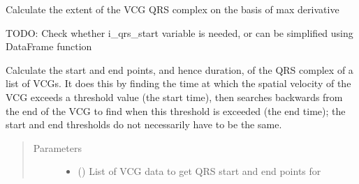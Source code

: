 \documentclass[letterpaper,10pt,english]{sphinxmanual}
\begin{document}
\begin{fulllineitems}
\label{\detokenize{_autosummary/signalanalysis.vcg.get_qrs_start_end:signalanalysis.vcg.get_qrs_start_end}}
\sphinxAtStartPar
Calculate the extent of the VCG QRS complex on the basis of max derivative

\sphinxAtStartPar
TODO: Check whether i\_qrs\_start variable is needed, or can be simplified using DataFrame function

\sphinxAtStartPar
Calculate the start and end points, and hence duration, of the QRS complex of a list of VCGs. It does this by
finding the time at which the spatial velocity of the VCG exceeds a threshold value (the start time), then searches
backwards from the end of the VCG to find when this threshold is exceeded (the end time); the start and end
thresholds do not necessarily have to be the same.
\begin{quote}\begin{description}
\item[{Parameters}] \leavevmode\begin{itemize}
\item {} 
\sphinxAtStartPar
{} () \textendash{} List of VCG data to get QRS start and end points for


\end{itemize}
\end{description}
\end{quote}
\end{fulllineitems}
\end{document}
